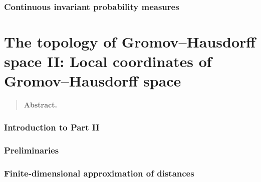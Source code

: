 \documentclass[11pt,reqno]{amsart}
\begin{document}
\section{Continuous invariant probability measures}\label{sec:measures}





\clearpage
\part{The topology of Gromov--Hausdorff space II: Local coordinates of Gromov--Hausdorff space}\label{part:spectral}
\begin{quote}
\small
\noindent\textbf{Abstract.}

\end{quote}

\section{Introduction to Part II}\label{sec:intro-spectral}


\section{Preliminaries}\label{sec:prelim-spectral}






\section{Finite-dimensional approximation of distances}\label{sec:spectral}





\end{document}
